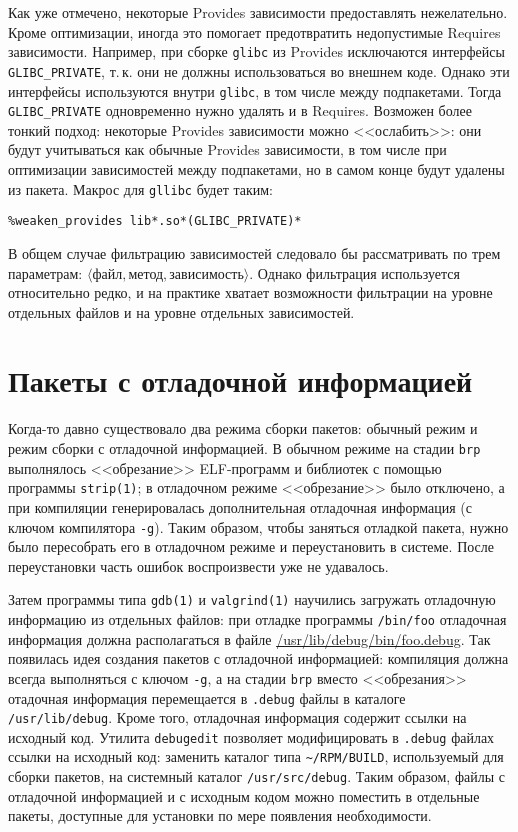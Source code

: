\documentclass[russian,a4paper,12pt,titlepage]{article}
\begin{document}
Как уже отмечено, некоторые Provides зависимости предоставлять нежелательно.  Кроме оптимизации, иногда это помогает
предотвратить недопустимые Requires зависимости.  Например, при сборке \verb|glibc| из Provides исключаются интерфейсы
\verb|GLIBC_PRIVATE|, т.\,к. они не должны использоваться во внешнем коде.
Однако эти интерфейсы используются внутри \verb|glibc|, в том числе между подпакетами.  Тогда
\verb|GLIBC_PRIVATE| одновременно нужно удалять и в Requires.  Возможен более тонкий подход: некоторые Provides зависимости
можно <<ослабить>>: они будут учитываться как обычные Provides зависимости, в том числе при оптимизации зависимостей между
подпакетами, но в самом конце будут удалены из пакета.  Макрос для \verb|gllibc| будет таким:
\begin{verbatim}
%weaken_provides lib*.so*(GLIBC_PRIVATE)*
\end{verbatim}

В общем случае фильтрацию зависимостей следовало бы рассматривать по трем параметрам:
$\langle\textit{файл},\textit{метод},\textit{зависимость}\rangle$.  Однако фильтрация используется относительно редко,
и на практике хватает возможности фильтрации на уровне отдельных файлов и на уровне отдельных зависимостей.

\section{Пакеты с отладочной информацией}
\label{debuginfo-packages}
Когда-то давно существовало два режима сборки пакетов: обычный режим и режим сборки с отладочной информацией.
В обычном режиме на стадии \verb|brp| выполнялось <<обрезание>> ELF-программ и библиотек с помощью программы \verb|strip(1)|;
в отладочном режиме <<обрезание>> было отключено, а при компиляции генерировалась дополнительная отладочная информация (с ключом
компилятора \verb|-g|).  Таким образом, чтобы заняться отладкой пакета, нужно было пересобрать его в отладочном режиме и переустановить
в системе.  После переустановки часть ошибок воспроизвести уже не удавалось.

Затем программы типа \verb|gdb(1)| и \verb|valgrind(1)| научились загружать отладочную информацию из отдельных файлов:
при отладке программы \verb|/bin/foo| отладочная информация должна располагаться в файле \url{/usr/lib/debug/bin/foo.debug}.
Так появилась идея создания пакетов с отладочной информацией: компиляция должна всегда выполняться с ключом \verb|-g|,
а на стадии \verb|brp| вместо <<обрезания>> отадочная информация перемещается в \verb|.debug| файлы
в каталоге \verb|/usr/lib/debug|.  Кроме того, отладочная информация содержит ссылки на исходный код.
Утилита \verb|debugedit| позволяет модифицировать в \verb|.debug| файлах ссылки на исходный код: заменить каталог
типа \verb|~/RPM/BUILD|, используемый для сборки пакетов, на системный каталог \verb|/usr/src/debug|.  Таким образом,
файлы с отладочной информацией и с исходным кодом можно поместить в отдельные пакеты, доступные для установки
по мере появления необходимости.
\end{document}
